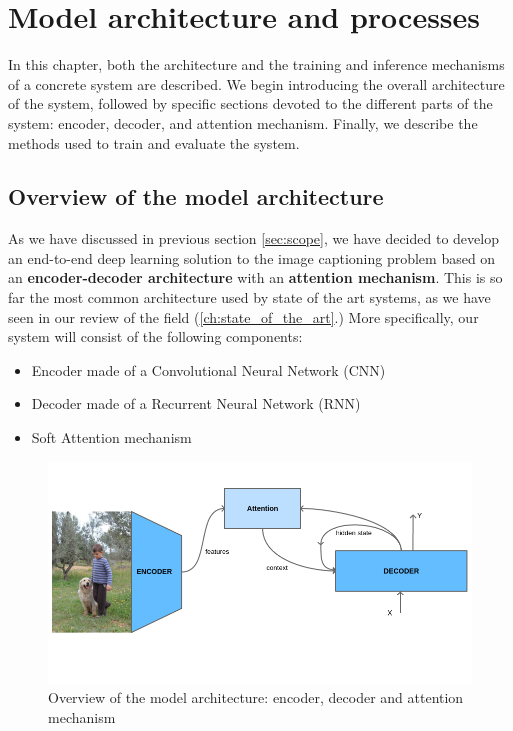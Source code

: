 \chapter{Model architecture and processes}
\label{ch:model}

In this chapter, both the architecture and the training and inference mechanisms of a concrete system are described. We begin introducing the overall architecture of the system, followed by specific sections devoted to the different parts of the system: encoder, decoder, and attention mechanism. Finally, we describe the methods used to train and evaluate the system.

\section{Overview of the model architecture}

As we have discussed in previous section \cref{sec:scope}, we have decided to develop an end-to-end deep learning solution to the image captioning problem based on an \textbf{encoder-decoder architecture} with an \textbf{attention mechanism}. This is so far the most common architecture used by state of the art systems, as we have seen in our review of the field (\cref{ch:state_of_the_art}.) More specifically, our system will consist of the following components:

\begin{itemize}
    \item Encoder made of a Convolutional Neural Network (CNN)
    \item Decoder made of a Recurrent Neural Network (RNN)
    \item Soft Attention mechanism
\end{itemize}

\begin{figure}[hpt]
    \centering
    \includegraphics[scale=0.5]{images/ch4/overview.png}
    \caption{Overview of the model architecture: encoder, decoder and attention mechanism}
    \label{fig:overview}
\end{figure}

